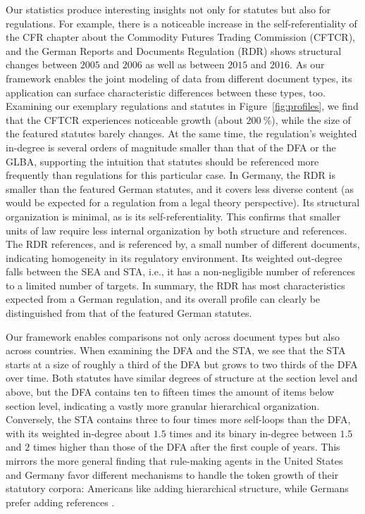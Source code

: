 \documentclass[utf8,sort&compress,table,hidelinks]{frontiersFPHY} %
\begin{document}
Our statistics produce interesting insights not only for statutes but also for regulations.
For example, there is a noticeable increase in the self-referentiality of the CFR chapter about the Commodity Futures Trading Commission (CFTCR),
and the German Reports and Documents Regulation (RDR) shows structural changes between $2005$ and $2006$ as well as between $2015$ and $2016$.
As our framework enables the joint modeling of data from different document types, its application can surface characteristic differences between these types, too.
Examining our exemplary regulations and statutes in Figure~\ref{fig:profiles},
we find that the CFTCR experiences noticeable growth (about $200~\%$),
while the size of the featured statutes barely changes.
At the same time, the regulation's weighted in-degree is several orders of magnitude smaller than that of the DFA or the GLBA, supporting the intuition that statutes should be referenced more frequently than regulations for this particular case. 
In Germany, the RDR is smaller than the featured German statutes,
and it covers less diverse content (as would be expected for a regulation from a legal theory perspective).
Its structural organization is minimal, as is its self-referentiality.
This confirms that smaller units of law require less internal organization by both structure and references.
The RDR references, and is referenced by, a small number of different documents, indicating homogeneity in its regulatory environment.
Its weighted out-degree falls between the SEA and STA, i.e., it has a non-negligible number of references to a limited number of targets.
In summary, the RDR has most characteristics expected from a German regulation, and its overall profile can clearly be distinguished from that of the featured German statutes.

Our framework enables comparisons not only across document types but also across countries.
When examining the DFA and the STA, we see that the STA starts at a size of roughly a third of the DFA but grows to two thirds of the DFA over time.
Both statutes have similar degrees of structure at the section level and above,
but the DFA contains ten to fifteen times the amount of items below section level, indicating a vastly more granular hierarchical organization.
Conversely, the STA contains three to four times more self-loops than the DFA, with its weighted in-degree about $1.5$ times and its binary in-degree between $1.5$ and $2$ times higher than those of the DFA after the first couple of years.
This mirrors the more general finding that rule-making agents in the United States and Germany favor different mechanisms to handle the token growth of their statutory corpora: 
Americans like adding hierarchical structure, while Germans prefer adding references \cite{katz2020}.
\end{document}
